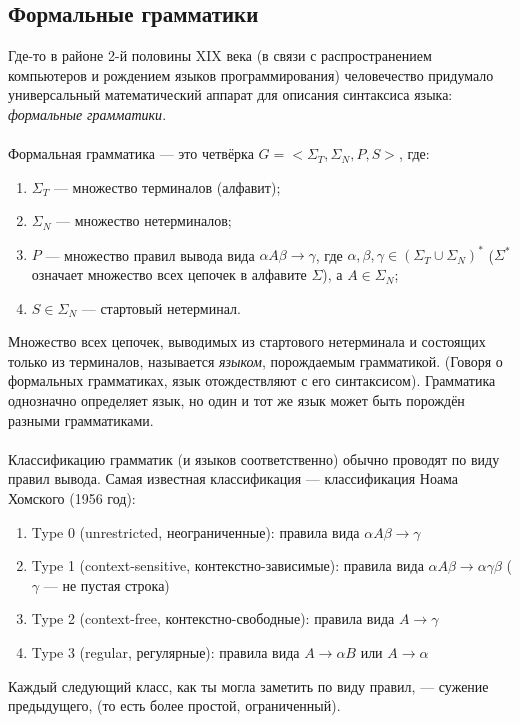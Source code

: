 \documentclass[11pt]{book}
\begin{document}
\subsection{Формальные грамматики}
Где-то в районе 2-й половины XIX века
(в связи с распространением компьютеров и рождением языков программирования)
человечество придумало универсальный математический аппарат для описания синтаксиса языка: \emph{формальные грамматики}.
\\ \\
Формальная грамматика --- это четвёрка $G=<\Sigma_T,\Sigma_N,P,S>$, где:
\begin{enumerate}
\item $\Sigma_T$ --- множество терминалов (алфавит);
\item $\Sigma_N$ --- множество нетерминалов;
\item $P$ --- множество правил вывода вида $\alpha A \beta \rightarrow \gamma$,
где $\alpha, \beta, \gamma \in (\Sigma_T \cup \Sigma_N)^*$ ($\Sigma^*$ означает множество всех цепочек в алфавите $\Sigma$),
а $A \in \Sigma_N$;
\item $S \in \Sigma_N$ --- стартовый нетерминал.
\end{enumerate}
Множество всех цепочек, выводимых из стартового нетерминала и состоящих только из терминалов, называется \emph{языком},
порождаемым грамматикой.
(Говоря о формальных грамматиках, язык отождествляют с его синтаксисом).
Грамматика однозначно определяет язык, но один и тот же язык может быть порождён разными грамматиками.
\\ \\
Классификацию грамматик (и языков соответственно) обычно проводят по виду правил вывода.
Самая известная классификация --- классификация Ноама Хомского (1956 год):
\begin{enumerate}
\item Type 0 (unrestricted, неограниченные): правила вида $\alpha A \beta \rightarrow \gamma$
\item Type 1 (context-sensitive, контекстно-зависимые): правила вида $\alpha A \beta \rightarrow \alpha \gamma \beta$ ($\gamma$ --- не пустая строка)
\item Type 2 (context-free, контекстно-свободные): правила вида $A \rightarrow \gamma$
\item Type 3 (regular, регулярные): правила вида $A \rightarrow \alpha B$ или $A \rightarrow \alpha$
\end{enumerate}
Каждый следующий класс, как ты могла заметить по виду правил, --- сужение предыдущего,
(то есть более простой, ограниченный).
\end{document}
